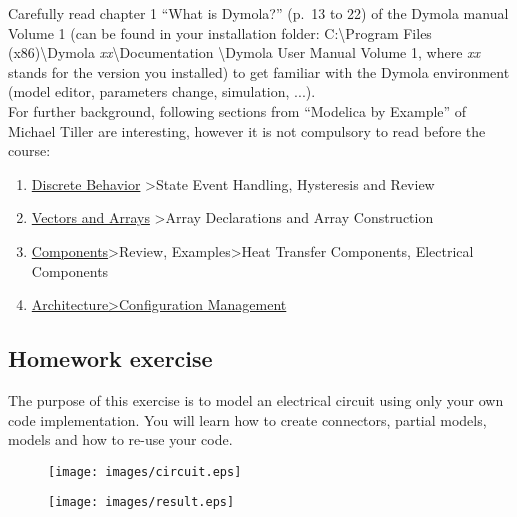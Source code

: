 \documentclass[10pt,a4paper]{article}
\begin{document}
Carefully read chapter 1 ``What is Dymola?'' (p.~13 to 22) of the Dymola manual 
Volume 1 (can be found in your installation folder: C:\textbackslash Program 
Files (x86)\textbackslash Dymola \textit{xx}\textbackslash Documentation 
\textbackslash Dymola User Manual Volume 1, where \textit{xx} stands for the 
version you installed) to get familiar with the Dymola environment (model 
editor, parameters change, simulation, ...).\\

For further background, following sections from ``Modelica by Example'' of 
Michael Tiller are interesting, however it is not compulsory to read before the 
course: 
\begin{enumerate}
\item \href{http://book.xogeny.com/behavior/discrete/}{Discrete Behavior} >State Event Handling, Hysteresis and Review
\item	\href{http://book.xogeny.com/behavior/arrays/}{Vectors and Arrays} >Array Declarations and Array Construction
\item	\href{http://book.xogeny.com/components/components/#review}{Components}>Review, Examples>Heat Transfer Components, Electrical Components
\item \href{http://book.xogeny.com/components/architectures/replaceable/}{Architecture>Configuration Management}
		
\end{enumerate}

\subsection*{Homework exercise}
The purpose of this exercise is to model an electrical circuit using only your own code implementation. You will learn how to create connectors, partial models, models and how to re-use your code.

\begin{figure}[h]
	\centering
	\begin{minipage}{.4\textwidth}
		\centering
		\texttt{[image: images/circuit.eps]}
		\label{fig:cir}
	\end{minipage}%
	\begin{minipage}{.6\textwidth}
		\centering
		\texttt{[image: images/result.eps]}
		\label{fig:res}
	\end{minipage}
\end{figure}
\end{document}
